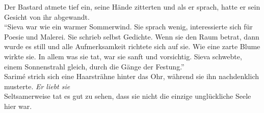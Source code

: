 Der Bastard atmete tief ein, seine Hände zitterten und als er sprach, hatte er sein Gesicht von ihr 
abgewandt.\\
``Sieva war wie ein warmer Sommerwind. Sie sprach wenig, interessierte sich für Poesie und Malerei. 
Sie schrieb selbst Gedichte. Wenn sie den Raum betrat, dann wurde es still und alle Aufmerksamkeit 
richtete sich auf sie. Wie eine zarte Blume wirkte sie. In allem was sie tat, war sie sanft und 
vorsichtig. Sieva schwebte, einem Sonnenstrahl gleich, durch die Gänge der Festung.''\\
Sarimé strich sich eine Haarsträhne hinter das Ohr, während sie ihn nachdenklich musterte. 
\textit{Er liebt sie}\\
Seltsamerweise tat es gut zu sehen, dass sie nicht die einzige unglückliche Seele hier war. 


